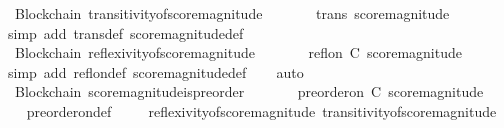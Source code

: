 \begin{isabellebody}
\isanewline
{}\isamarkupfalse%
\ {\isacharparenleft}\ Blockchain{\isacharparenright}\ transitivity{\isacharunderscore}of{\isacharunderscore}score{\isacharunderscore}magnitude\ {\isacharcolon}\isanewline
\ \ {\isachardoublequoteopen}{\isasymforall}\ {\isasymsigma}\ {\isasymin}\ {\isasymSigma}{\isachardot}\ trans\ {\isacharparenleft}score{\isacharunderscore}magnitude\ {\isasymsigma}{\isacharparenright}{\isachardoublequoteclose}\isanewline
%
\isadelimproof
\ \ %
\endisadelimproof
%
\isatagproof
{}\isamarkupfalse%
\ {\isacharparenleft}simp\ add{\isacharcolon}\ trans{\isacharunderscore}def\ score{\isacharunderscore}magnitude{\isacharunderscore}def{\isacharparenright}%
\endisatagproof
{\isafoldproof}%
%
\isadelimproof
\isanewline
%
\endisadelimproof
\ \ \isanewline
{}\isamarkupfalse%
\ {\isacharparenleft}\ Blockchain{\isacharparenright}\ reflexivity{\isacharunderscore}of{\isacharunderscore}score{\isacharunderscore}magnitude\ {\isacharcolon}\isanewline
\ \ {\isachardoublequoteopen}{\isasymforall}\ {\isasymsigma}\ {\isasymin}\ {\isasymSigma}{\isachardot}\ refl{\isacharunderscore}on\ C\ {\isacharparenleft}score{\isacharunderscore}magnitude\ {\isasymsigma}{\isacharparenright}{\isachardoublequoteclose}\isanewline
%
\isadelimproof
\ \ %
\endisadelimproof
%
\isatagproof
{}\isamarkupfalse%
\ {\isacharparenleft}simp\ add{\isacharcolon}\ refl{\isacharunderscore}on{\isacharunderscore}def\ score{\isacharunderscore}magnitude{\isacharunderscore}def{\isacharparenright}\isanewline
\ \ \isamarkupfalse%
\ auto%
\endisatagproof
{\isafoldproof}%
%
\isadelimproof
\isanewline
%
\endisadelimproof
\ \ \isanewline
{}\isamarkupfalse%
\ {\isacharparenleft}\ Blockchain{\isacharparenright}\ score{\isacharunderscore}magnitude{\isacharunderscore}is{\isacharunderscore}preorder\ {\isacharcolon}\isanewline
\ \ {\isachardoublequoteopen}{\isasymforall}\ {\isasymsigma}\ {\isasymin}\ {\isasymSigma}{\isachardot}\ preorder{\isacharunderscore}on\ C\ {\isacharparenleft}score{\isacharunderscore}magnitude\ {\isasymsigma}{\isacharparenright}{\isachardoublequoteclose}\isanewline
%
\isadelimproof
\ \ %
\endisadelimproof
%
\isatagproof
{}\isamarkupfalse%
\ preorder{\isacharunderscore}on{\isacharunderscore}def\ \isanewline
\ \ \isamarkupfalse%
\ reflexivity{\isacharunderscore}of{\isacharunderscore}score{\isacharunderscore}magnitude\ transitivity{\isacharunderscore}of{\isacharunderscore}score{\isacharunderscore}magnitude\ \isamarkupfalse%

\end{isabellebody}
